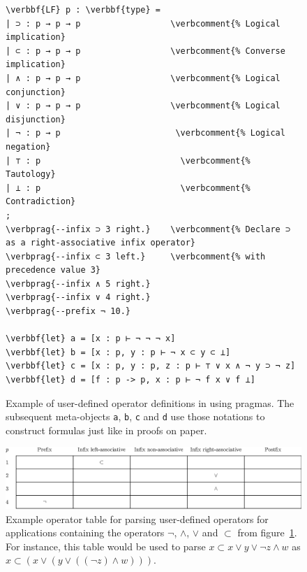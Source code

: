 \begin{figure}[!htb]
\begin{Verbatim}[commandchars=\\\{\}]
\verbbf{LF} p : \verbbf{type} =
| ⊃ : p → p → p                  \verbcomment{% Logical implication}
| ⊂ : p → p → p                  \verbcomment{% Converse implication}
| ∧ : p → p → p                  \verbcomment{% Logical conjunction}
| ∨ : p → p → p                  \verbcomment{% Logical disjunction}
| ¬ : p → p                       \verbcomment{% Logical negation}
| ⊤ : p                            \verbcomment{% Tautology}
| ⊥ : p                            \verbcomment{% Contradiction}
;
\verbprag{--infix ⊃ 3 right.}    \verbcomment{% Declare ⊃ as a right-associative infix operator}
\verbprag{--infix ⊂ 3 left.}     \verbcomment{% with precedence value 3}
\verbprag{--infix ∧ 5 right.}
\verbprag{--infix ∨ 4 right.}
\verbprag{--prefix ¬ 10.}

\verbbf{let} a = [x : p ⊢ ¬ ¬ ¬ x]
\verbbf{let} b = [x : p, y : p ⊢ ¬ x ⊂ y ⊂ ⊥]
\verbbf{let} c = [x : p, y : p, z : p ⊢ ⊤ ∨ x ∧ ¬ y ⊃ ¬ z]
\verbbf{let} d = [f : p -> p, x : p ⊢ ¬ f x ∨ f ⊥]
\end{Verbatim}
\caption[Example of user-defined operator definitions in \Beluga using pragmas.]{%
Example of user-defined operator definitions in \Beluga using pragmas.
The subsequent meta-objects \texttt{a}, \texttt{b}, \texttt{c} and \texttt{d} use those notations to construct formulas just like in proofs on paper.
}
\label{figure:operator-pragmas}
\end{figure}

\begin{figure}
\includegraphics[width=\textwidth]{figures/operator-table.eps}
\caption[Example operator table for parsing user-defined operators.]{%
Example operator table for parsing user-defined operators for applications containing the operators $\lnot$, $\land$, $\lor$ and $\subset$ from figure~\ref{figure:operator-pragmas}.
For instance, this table would be used to parse $x \subset x \lor y \lor \lnot z \land w$ as $x \subset (x \lor (y \lor ((\lnot z) \land w)))$.
}
\label{figure:operator-table}
\end{figure}

